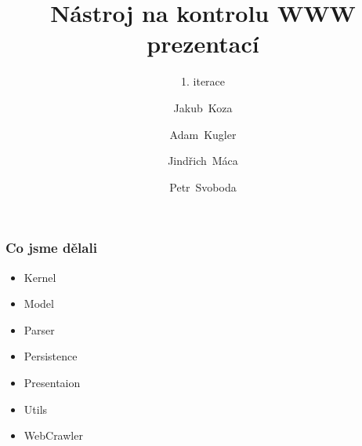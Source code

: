 \documentclass{beamer}
\begin{document}
\title [NKWP]{Nástroj na kontrolu WWW prezentací}
\author[J.~ Koza, A.~ Kugler, J.~Máca, P.~Svoboda]{Jakub~Koza \and Adam~Kugler \and Jindřich~Máca \and Petr~Svoboda}

\subtitle{1. iterace}
\frame{\titlepage}
\begin{frame}[allowframebreaks]\frametitle{Co jsme dělali}
   \begin{itemize}
    \item Kernel
		\item Model
		\item Parser
		\item Persistence
		\item Presentaion
		\item Utils
		\item WebCrawler
   \end{itemize}
\end{frame}
\end{document}
